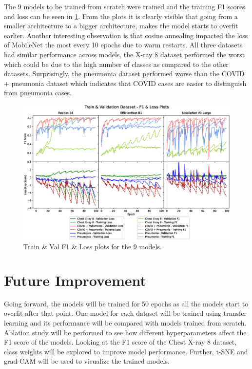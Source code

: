 \documentclass[10pt,twocolumn,letterpaper]{article}
\begin{document}
The 9 models to be trained from scratch were trained and the training F1 scores and loss can be seen in \cref{fig:acc_loss_sep}. From the plots it is clearly visible that going from a smaller architecture to a bigger architecture, makes the model starts to overfit earlier. Another interesting observation is that cosine annealing impacted the loss of MobileNet the most every 10 epochs due to warm restarts. All three datasets had similar performance across models, the X-ray 8 dataset performed the worst which could be due to the high number of classes as compared to the other datasets. Surprisingly, the pneumonia dataset performed worse than the COVID + pneumonia dataset which indicates that COVID cases are easier to distinguish from pneumonia cases. 

\begin{figure}[t]
  \centering
  \includegraphics[width=1\linewidth]{f1_loss_separate.eps}  
   \caption{Train \& Val F1 \& Loss plots for the 9 models.}
   \vspace{-1.5em}
   \label{fig:acc_loss_sep}
\end{figure}

\section{Future Improvement}
\label{sec:future}
Going forward, the models will be trained for 50 epochs as all the models start to overfit after that point. One model for each dataset will be trained using transfer learning and its performance will be compared with models trained from scratch. Ablation study will be performed to see how different hyperparameters affect the F1 score of the models. Looking at the F1 score of the Chest X-ray 8 dataset, class weights will be explored to improve model performance. Further, t-SNE \cite{van2008visualizing} and grad-CAM \cite{jacobgilpytorchcam} will be used to visualize the trained models.

\clearpage
{\small


}
\end{document}
